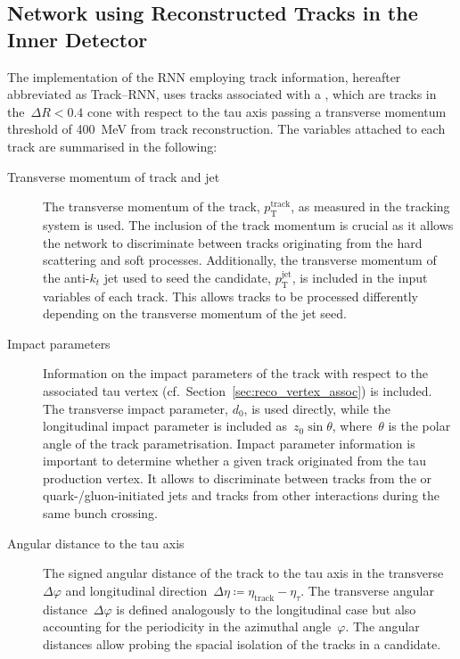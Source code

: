 \subsection{Network using Reconstructed Tracks in the Inner Detector}
\label{sec:rnn_tracks}

The implementation of the RNN employing track information, hereafter abbreviated
as Track--RNN, uses tracks associated with a \tauhadvis, which are tracks in
the~$\Delta R < 0.4$ cone with respect to the tau axis passing a transverse
momentum threshold of \SI{400}{\MeV} from track reconstruction. The variables
attached to each track are summarised in the following:
\begin{description}
\item[Transverse momentum of track and jet] The transverse momentum of the
  track, $p_\text{T}^\text{track}$, as measured in the tracking system is used.
  The inclusion of the track momentum is crucial as it allows the network to
  discriminate between tracks originating from the hard scattering and soft
  processes. Additionally, the transverse momentum of the anti-$k_t$ jet used to
  seed the \tauhadvis candidate, $p_\text{T}^\text{jet}$, is included in the
  input variables of each track. This allows tracks to be processed differently
  depending on the transverse momentum of the jet seed.

\item[Impact parameters] Information on the impact parameters of the track with
  respect to the associated tau vertex (cf.\
  Section~\ref{sec:reco_vertex_assoc}) is included. The transverse impact
  parameter, $d_0$, is used directly, while the longitudinal impact parameter is
  included as~$z_0 \sin\theta$, where~$\theta$ is the polar angle of the track
  parametrisation.
  Impact parameter information is important to determine whether a given track
  originated from the tau production vertex. It allows to discriminate between
  tracks from the \tauhad or quark-/gluon-initiated jets and tracks from other
  interactions during the same bunch crossing.

\item[Angular distance to the tau axis] The signed angular distance of the track
  to the tau axis in the transverse~$\Delta \varphi$ and longitudinal
  direction~$\Delta \eta \coloneqq \eta_\text{track} - \eta_\tau$. The transverse
  angular distance~$\Delta \varphi$ is defined analogously to the longitudinal
  case but also accounting for the periodicity in the azimuthal angle~$\varphi$.
  The angular distances allow probing the spacial isolation of the tracks in a
  \tauhadvis candidate.


\end{description}

